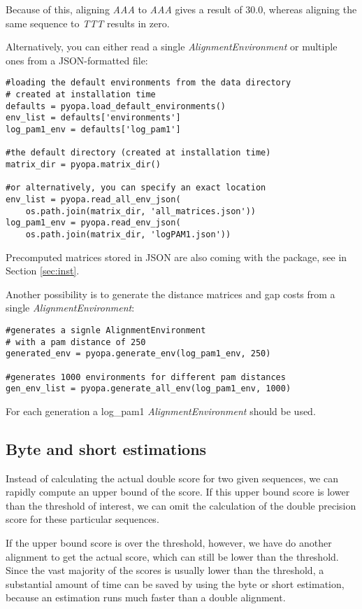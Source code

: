 \documentclass[12pt]{article}
\newcommand{\alenv}{\emph{AlignmentEnvironment}}
\begin{document}
Because of this, aligning \emph{AAA} to \emph{AAA} gives a result of 30.0, whereas aligning the same sequence to \emph{TTT} results in zero.


Alternatively, you can either read a single \alenv{} or multiple ones from a JSON-formatted file:
\begin{lstlisting}
#loading the default environments from the data directory
# created at installation time
defaults = pyopa.load_default_environments()
env_list = defaults['environments']
log_pam1_env = defaults['log_pam1']

#the default directory (created at installation time)
matrix_dir = pyopa.matrix_dir()

#or alternatively, you can specify an exact location
env_list = pyopa.read_all_env_json(
    os.path.join(matrix_dir, 'all_matrices.json'))
log_pam1_env = pyopa.read_env_json(
    os.path.join(matrix_dir, 'logPAM1.json'))
\end{lstlisting}

Precomputed matrices stored in JSON are also coming with the package, see in Section \ref{sec:inst}.

Another possibility is to generate the distance matrices and gap costs from a single \alenv{}:

\begin{lstlisting}
#generates a signle AlignmentEnvironment
# with a pam distance of 250
generated_env = pyopa.generate_env(log_pam1_env, 250)

#generates 1000 environments for different pam distances
gen_env_list = pyopa.generate_all_env(log_pam1_env, 1000)
\end{lstlisting}

For each generation a log\_pam1 \alenv{} should be used.

\subsection{Byte and short estimations}
\label{subsec:bsEstim}
Instead of calculating the actual double score for two given sequences, we can rapidly compute an upper bound of the score. If this upper bound score is lower than the threshold of interest, we can omit the calculation of the double precision score for these particular sequences.

If the upper bound score is over the threshold, however, we have do another alignment to get the actual
 score, which can still be lower than the threshold. Since the vast majority of the scores is usually lower than the threshold, a substantial amount of time can be saved by using the byte or short estimation, because an estimation runs much faster than a double alignment.
\end{document}

